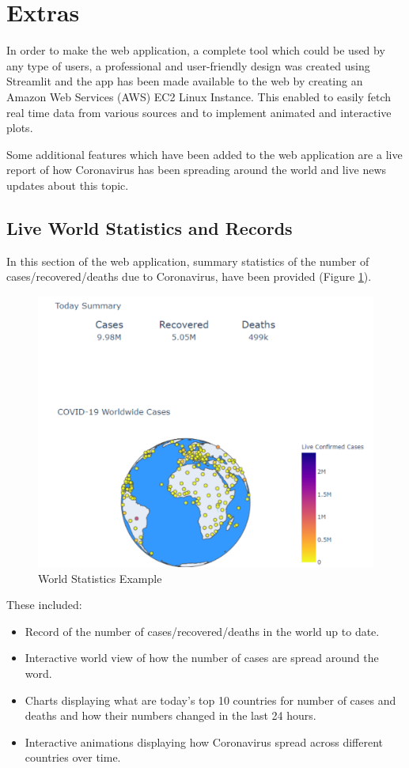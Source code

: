 \section{Extras}
In order to make the web application, a complete tool which could be used by any type of users, a professional and user-friendly design was created using Streamlit and the app has been made available to the web by creating an Amazon Web Services (AWS) EC2 Linux Instance. This enabled to easily fetch real time data from various sources and to implement animated and interactive plots.

Some additional features which have been added to the web application are a live report of how Coronavirus has been spreading around the world and live news updates about this topic.

\subsection{Live World Statistics and Records}

In this section of the web application, summary statistics of the number of cases/recovered/deaths due to Coronavirus, have been provided (Figure \ref{world}). 

\begin{figure}[ht!]%
    \centering
    \includegraphics[width=0.75\linewidth]{latex/images/world.pdf}
    \caption{World Statistics Example}
    \label{world}
\end{figure}

These included:

\begin{itemize}
    \setlength\itemsep{-0.3cm}
    \item Record of the number of cases/recovered/deaths in the world up to date.
    \item Interactive world view of how the number of cases are spread around the word.
    \item Charts displaying what are today's top 10 countries for number of cases and deaths and how their numbers changed in the last 24 hours.
    \item Interactive animations displaying how Coronavirus spread across different countries over time.
\end{itemize}

